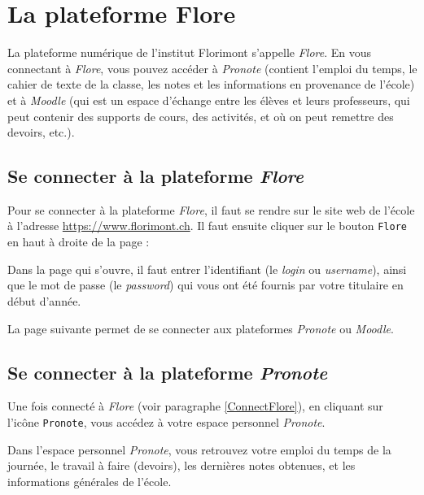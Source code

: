 \chapter{La plateforme Flore}\label{plateformeFlore}  


La plateforme numérique de l'institut Florimont s'appelle \emph{Flore}. En vous connectant à \emph{Flore}, vous pouvez accéder à \emph{Pronote} (contient l'emploi du temps, le cahier de texte de la classe, les notes et les informations en provenance de l'école) et à \emph{Moodle} (qui est un espace d'échange entre les élèves et leurs professeurs, qui peut contenir des supports de cours, des activités, et où on peut remettre des devoirs, etc.).

\section{Se connecter à la plateforme \emph{Flore}}\label{ConnectFlore}

Pour se connecter à la plateforme \emph{Flore}, il faut se rendre sur le site web de l'école à l'adresse \url{https://www.florimont.ch}. Il faut ensuite cliquer sur le bouton \texttt{Flore} en haut à droite de la page :


Dans la page qui s'ouvre, il faut entrer l'identifiant (le \emph{login} ou \emph{username}), ainsi que le mot de passe (le \emph{password}) qui vous ont été fournis par votre titulaire en début d'année.



La page suivante permet de se connecter aux plateformes \emph{Pronote} ou \emph{Moodle}.



\section{Se connecter à la plateforme \emph{Pronote}}

Une fois connecté à \emph{Flore} (voir paragraphe \vref{ConnectFlore}), en cliquant sur l'icône \texttt{Pronote}, vous accédez à votre espace personnel \emph{Pronote}.


Dans l'espace personnel \emph{Pronote}, vous retrouvez votre emploi du temps de la journée, le travail à faire (devoirs), les dernières notes obtenues, et les informations générales de l'école.


